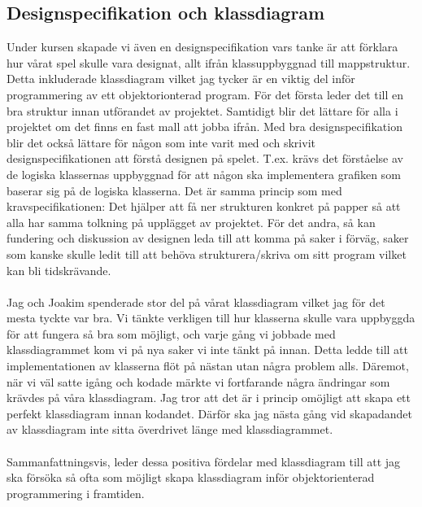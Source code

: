 \documentclass{TDP003mall}
\begin{document}
	\subsection{Designspecifikation och klassdiagram}
	Under kursen skapade vi även en designspecifikation vars tanke är att förklara hur vårat spel skulle vara designat, allt ifrån klassuppbyggnad till mappstruktur. Detta inkluderade klassdiagram vilket jag tycker är en viktig del inför programmering av ett objektorionterad program. För det första leder det till en bra struktur innan utförandet av projektet. Samtidigt blir det lättare för alla i projektet om det finns en fast mall att jobba ifrån. Med bra designspecifikation blir det också lättare för någon som inte varit med och skrivit designspecifikationen att förstå designen på spelet. T.ex. krävs det förståelse av de logiska klassernas uppbyggnad för att någon ska implementera grafiken som baserar sig på de logiska klasserna. Det är samma princip som med kravspecifikationen: Det hjälper att få ner strukturen konkret på papper så att alla har samma tolkning på upplägget av projektet. För det andra, så kan fundering och diskussion av designen leda till att komma på saker i förväg, saker som kanske skulle ledit till att behöva strukturera/skriva om sitt program vilket kan bli tidskrävande.
	\\ \\
	Jag och Joakim spenderade stor del på vårat klassdiagram vilket jag för det mesta tyckte var bra. Vi tänkte verkligen till hur klasserna skulle vara uppbyggda för att fungera så bra som möjligt, och varje gång vi jobbade med klassdiagrammet kom vi på nya saker vi inte tänkt på innan. Detta ledde till att implementationen av klasserna flöt på nästan utan några problem alls. Däremot, när vi väl satte igång och kodade märkte vi fortfarande några ändringar som krävdes på våra klassdiagram. Jag tror att det är i princip omöjligt att skapa ett perfekt klassdiagram innan kodandet. Därför ska jag nästa gång vid skapadandet av klassdiagram inte sitta överdrivet länge med klassdiagrammet. 
	\\ \\
	Sammanfattningsvis, leder dessa positiva fördelar med klassdiagram till att jag ska försöka så ofta som möjligt skapa klassdiagram inför objektorienterad programmering i framtiden.
	
\end{document}
